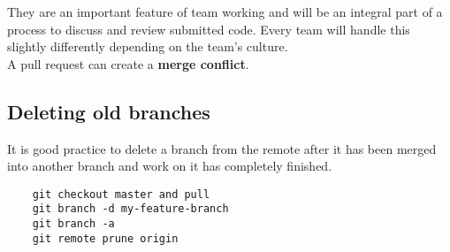 They are an important feature of team working and will be an integral part of a process to discuss and review submitted code. Every team will handle this slightly differently depending on the team's culture.
\\

A pull request can create a \textbf{merge conflict}.



\subsection{Deleting old branches}

It is good practice to delete a branch from the remote after it has been merged into another branch and work on it has completely finished.

\begin{verbatim}
    git checkout master and pull
    git branch -d my-feature-branch
    git branch -a
    git remote prune origin
\end{verbatim}
